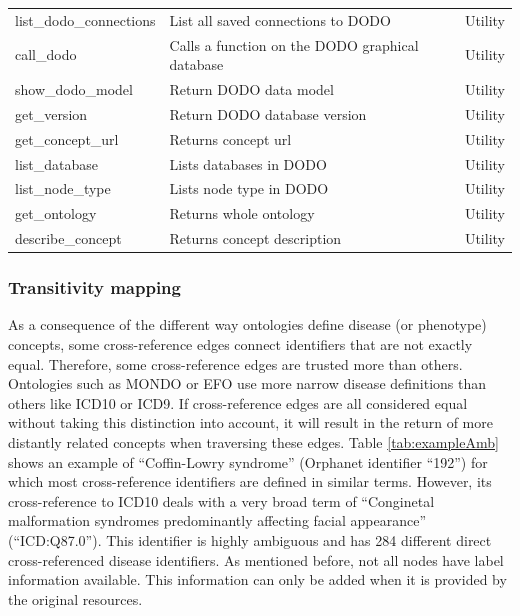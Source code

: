 \documentclass[9pt,a4paper,]{extarticle}
\begin{document}
\begin{table}
{\begin{tabular}[t]{lll}
\rowcolor{gray!6}  list\_dodo\_connections & List all saved connections to DODO & Utility\\
call\_dodo & Calls a function on the DODO graphical database & Utility\\
\rowcolor{gray!6}  show\_dodo\_model & Return DODO data model & Utility\\
get\_version & Return DODO database version & Utility\\
\addlinespace
\rowcolor{gray!6}  get\_concept\_url & Returns concept url & Utility\\
list\_database & Lists databases in DODO & Utility\\
\rowcolor{gray!6}  list\_node\_type & Lists node type in DODO & Utility\\
get\_ontology & Returns whole ontology & Utility\\
\rowcolor{gray!6}  describe\_concept & Returns concept description & Utility\\
\bottomrule
\end{tabular}}
\end{table}

\hypertarget{transitivity-mapping}{%
\subsubsection{Transitivity mapping}\label{transitivity-mapping}}

As a consequence of the different way ontologies define disease (or phenotype) concepts, some cross-reference edges connect identifiers that are not exactly equal. Therefore, some cross-reference edges are trusted more than others. Ontologies such as MONDO or EFO use more narrow disease definitions than others like ICD10 or ICD9. If cross-reference edges are all considered equal without taking this distinction into account, it will result in the return of more distantly related concepts when traversing these edges. Table \ref{tab:exampleAmb} shows an example of ``Coffin-Lowry syndrome'' (Orphanet identifier ``192'') for which most cross-reference identifiers are defined in similar terms. However, its cross-reference to ICD10 deals with a very broad term of ``Conginetal malformation syndromes predominantly affecting facial appearance'' (``ICD:Q87.0''). This identifier is highly ambiguous and has 284 different direct cross-referenced disease identifiers. As mentioned before, not all nodes have label information available. This information can only be added when it is provided by the original resources.
\end{document}
